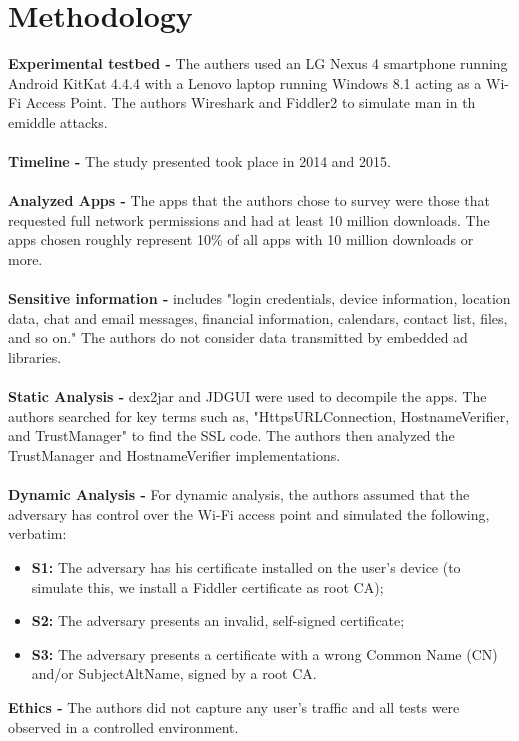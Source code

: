 \documentclass{article}
\begin{document}
\section{Methodology}
\textbf{Experimental testbed -} The authers used an LG Nexus 4 smartphone  running Android KitKat 4.4.4 with a Lenovo laptop running Windows 8.1 acting as a Wi-Fi Access Point. The authors Wireshark and Fiddler2 to simulate man in th emiddle attacks. 
\\\\\textbf{Timeline -} The study presented took place in 2014 and 2015.
\\\\\textbf{Analyzed Apps -} The apps that the authors chose to survey were those that requested full network permissions and had at least 10 million downloads. The apps chosen roughly represent 10\% of all apps with 10 million downloads or more. 
\\\\\textbf{Sensitive information -} includes "login credentials, device information, location data, chat and email messages, financial information, calendars, contact list, files, and so on." The authors do not consider data transmitted by embedded ad libraries. 
\\\\\textbf{Static Analysis -} dex2jar and JDGUI were used to decompile the apps. The authors searched for key terms such as, "HttpsURLConnection, HostnameVerifier, and TrustManager" to find the SSL code. The authors then analyzed the TrustManager and HostnameVerifier implementations. 
\\\\\textbf{Dynamic Analysis -} For dynamic analysis, the authors assumed that the adversary has control over the Wi-Fi access point and simulated the following, verbatim:
\begin{itemize}
\item \textbf{S1:} The adversary has his certificate installed on the user's device (to simulate this, we install a Fiddler certificate as root CA);
\item \textbf{S2:} The adversary presents an invalid, self-signed certificate; 
\item \textbf{S3:} The adversary presents a certificate with a wrong Common Name (CN) and/or SubjectAltName, signed by a root CA.
\end{itemize}
\textbf{Ethics -} The authors did not capture any user's traffic and all tests were observed in a controlled environment. 
\end{document}
